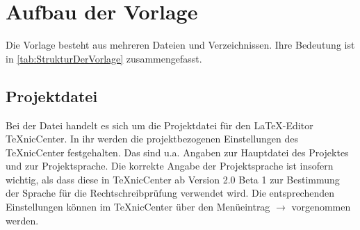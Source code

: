 \section{Aufbau der Vorlage}%
\label{sec:AufbauDerVorlage}
%
Die Vorlage besteht aus mehreren Dateien und Verzeichnissen.
Ihre Bedeutung ist in \cref{tab:StrukturDerVorlage} zusammengefasst.

{%
\footnotesize%
\renewcommand{\arraystretch}{2.0}%
\setlength{\tabcolsep}{0pt}%
%
}%


\subsection{Projektdatei }%
%
\label{sec:Projektdatei}
%
Bei der Datei  handelt es sich um die Projektdatei für den \LaTeX-Editor TeXnicCenter.
In ihr werden die projektbezogenen Einstellungen des TeXnicCenter festgehalten.
Das sind u.a. Angaben zur Hauptdatei des Projektes und zur Projektsprache.
Die korrekte Angabe der Projektsprache ist insofern wichtig, als dass diese in TeXnicCenter ab Version 2.0 Beta 1 zur Bestimmung der Sprache für die Rechtschreibprüfung verwendet wird.
Die entsprechenden Einstellungen können im TeXnicCenter über den Menüeintrag  $\rightarrow$  vorgenommen werden.


